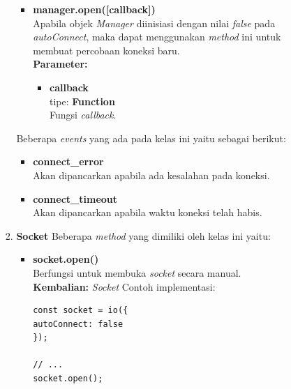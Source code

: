 \documentclass[a4paper,twoside]{article}
\begin{document}
\begin{enumerate}
\begin{enumerate}
\begin{enumerate}
\begin{itemize}
				\item \textbf{manager.open([callback])} \\
				Apabila objek \textit{Manager} diinisiasi dengan nilai \textit{false} pada \textit{autoConnect}, maka dapat menggunakan \textit{method} ini untuk membuat percobaan koneksi baru.\\
				\textbf{Parameter:}
				\begin{itemize}
					\item \textbf{callback} \\tipe: \textbf{Function} \\ Fungsi \textit{callback}.
				\end{itemize}
			\end{itemize}
			
			Beberapa \textit{events} yang ada pada kelas ini yaitu sebagai berikut:
			\begin{itemize}
				\item \textbf{connect\_error} \\ Akan dipancarkan apabila ada kesalahan pada koneksi.
				\item \textbf{connect\_timeout} \\ Akan dipancarkan apabila waktu koneksi telah habis.
			\end{itemize}
			
			\item \textbf{Socket}
			Beberapa \textit{method} yang dimiliki oleh kelas ini yaitu:
			\begin{itemize}
				\item \textbf{socket.open()} \\ Berfungsi untuk membuka \textit{socket} secara manual.\\
				\textbf{Kembalian:} \textit{Socket}
				Contoh implementasi:
\begin{lstlisting}
const socket = io({
autoConnect: false
});
				
// ...
socket.open();
\end{lstlisting}
				

\end{itemize}
\end{enumerate}
\end{enumerate}
\end{enumerate}
\end{document}
